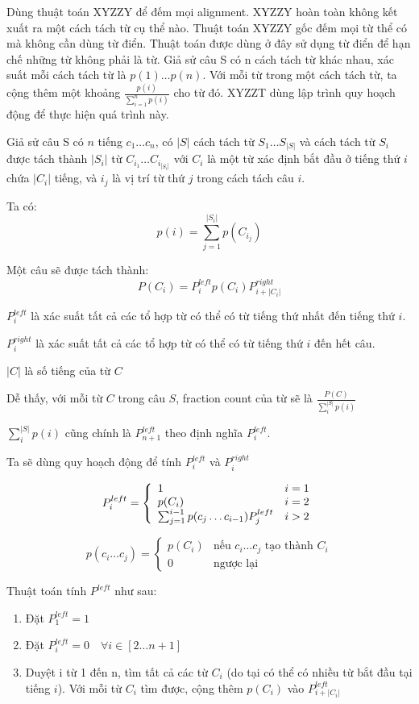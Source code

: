 \documentclass[a4paper]{book}
\begin{document}
Dùng thuật toán XYZZY để đếm mọi alignment. XYZZY hoàn toàn không kết
xuất ra một cách tách từ cụ thể nào. Thuật toán XYZZY gốc đếm mọi từ
thể có mà không cần dùng từ điển. Thuật toán được dùng ở đây sử dụng
từ điển để hạn chế những từ không phải là từ. Giả sử câu S có n cách
tách từ khác nhau, xác suất mỗi cách tách từ là $p(1) \ldots
p(n)$. Với mỗi từ trong một cách tách từ, ta cộng thêm một khoảng
$\displaystyle\frac{p(i)}{\sum_{i=1}^n{p(i)}}$ cho từ đó. XYZZT dùng
lập trình quy hoạch động để thực hiện quá trình này.

Giả sử câu S có $n$ tiếng $c_1\ldots c_n$, có $|S|$ cách tách từ
$S_1\ldots S_{|S|}$ và cách tách từ  $S_i$ được
tách thành $|S_i|$ từ $C_{i_1}\ldots C_{i_{|S_i|}}$ với 
$C_i$ là một từ xác định bắt đầu ở tiếng thứ $i$ chứa $|C_i|$ tiếng, và
$i_j$ là vị trí từ thứ $j$ trong cách tách câu $i$.

Ta có:
$$p(i)=\sum_{j=1}^{|S_i|}{p(C_{i_j})}$$

Một câu sẽ được tách thành:
$$P(C_i) = P_{i}^{left}p(C_{i})P_{i+|C_i|}^{right}$$

$P_i^{left}$ là xác suất tất cả các tổ hợp từ có thể có từ 
tiếng thứ nhất đến tiếng thứ $i$.

$P_{i}^{right}$ là xác suất tất cả các tổ hợp từ có thể có từ tiếng
thứ  $i$ đến hết câu. 

$|C|$ là số tiếng của từ $C$

Dễ thấy, với mỗi từ $C$ trong câu $S$, fraction count của từ sẽ là
$\displaystyle\frac{P(C)}{\sum_i^{|S|}p(i)}$

$\displaystyle\sum_i^{|S|}p(i)$ cũng chính là $P_{n+1}^{left}$ theo
định nghĩa $P_i^{left}$.

Ta sẽ dùng quy hoạch động để tính $P_i^{left}$ và $P_i^{right}$

$$
P_i^{left} = \left\{
  \begin{array}{l r}
    1 & i=1\\
    p(C_i) & i=2\\
    \sum_{j=1}^{i-1}p(c_j\ldots c_{i-1})P_j^{left} & i>2
  \end{array}
\right.
$$

$$
p(c_i\ldots c_j) = \left\{
  \begin{array}{ll}
    p(C_i)&\text{nếu } c_i\ldots c_j \text{ tạo thành } C_i\\
    0&\text{ngược lại}
  \end{array}
\right.
$$

Thuật toán tính $P^{left}$ như sau:
\begin{enumerate}
\item Đặt $P_1^{left} = 1$
\item Đặt $P_i^{left} = 0\quad \forall i \in [2\ldots n+1]$
\item Duyệt i từ 1 đến n, tìm tất cả các từ $C_i$ (do tại có thể có
  nhiều từ bắt đầu tại tiếng $i$).
  Với mỗi từ $C_i$ tìm được, cộng thêm $p(C_i)$ vào $P_{i+|C_i|}^{left}$
\end{enumerate}
\end{document}
